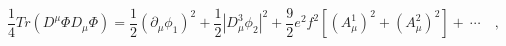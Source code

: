 \begin{equation}
\frac{1}{4}Tr(D^\mu \Phi D_\mu \Phi) = \frac{1}{2}(\partial_\mu\phi_1)^2 +
\frac{1}{2}\left|D_\mu^3 \phi_2\right|^2 +\frac{9}{2}e^2f^2\left[\left(A_\mu^1\right)^2 + \left(A_\mu^2\right)^2\right] +~\cdots\quad,
\end{equation}

